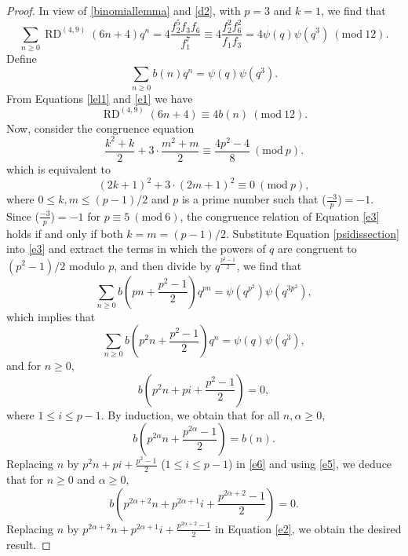 \documentclass[10pt,a4paper]{amsart}
\DeclareMathOperator {\myRD}{RD}
\begin{document}
\begin{proof} 
In view of \eqref{binomiallemma} and \eqref{d2}, with $p=3$ and $k=1$, we find that
\begin{equation}
\sum_{n\geq 0} \myRD^{(4, 9)}(6n+4)q^{n}=4\dfrac{f_{2}^{5}f_{3}f_{6}}{f_{1}^{7}} \equiv 4 \dfrac{f_{2}^{2} f_{6}^{2}}{f_{1} f_{3}} = 4\psi(q) \psi(q^{3}) \ (\mathrm{mod} \ 12). \label{lel1}
\end{equation}
Define
\begin{equation} 
\sum_{n\geq 0} b(n)q^{n} = \psi(q) \psi(q^{3}). \label{e1}
\end{equation}
From  Equations \eqref{lel1} and \eqref{e1} we have 
\begin{equation}
\myRD^{(4, 9)}(6n+4) \equiv 4b(n) \ (\mathrm{mod} \ 12).  \label{e2}
\end{equation} 
Now, consider the congruence equation
\[
\frac{k^{2}+k}{2}+3\cdot \frac{m^{2}+m}{2} \equiv  \frac{4p^{2}-4}{8} \ (\mathrm{mod} \ p).
\]
which is equivalent to
\begin{equation}
(2k+1)^{2}+ 3\cdot (2m+1)^{2}  \equiv  0 \ (\mathrm{mod} \ p), \label{e3}
\end{equation}
where $0 \leq k,m \leq (p-1)/2$ and $p$ is a prime number such that ($\frac{-3}{p}$)$=-1$. Since ($\frac{-3}{p}$)$=-1$ for $p \equiv 5 \ (\mathrm{mod} \ 6)$, the congruence relation of Equation \eqref{e3} holds if and only if both $k=m=(p-1)/2$. Substitute Equation \eqref{psidissection} into \eqref{e3} and extract the terms in which the powers of $q$ are congruent to $(p^{2}-1)/2$ modulo $p$, and then divide by $q^{\frac{p^{2}-1}{2}}$, we find that
\[
\sum_{n\geq 0} b \left(pn+\frac{p^{2}-1}{2} \right) q^{pn} = \psi(q^{p^{2}}) \psi(q^{3p^{2}}),
\]
which implies that 
\[
\sum_{n\geq 0} b\left( p^{2}n+\frac{p^{2}-1}{2} \right)q^{n} = \psi(q) \psi(q^{3}),
\]
and for $n\geq 0$,
\begin{equation}
b \left(p^{2}n+pi+\frac{p^{2}-1}{2}\right) = 0, \label{e5}
\end{equation}
where  $1\leq i \leq p-1$. By induction, we obtain  that for all $n, \alpha \geq 0$,
\begin{equation}
b\left( p^{2\alpha}n+\frac{p^{2\alpha}-1}{2} \right)=b(n). \label{e6}
\end{equation}
Replacing $n$ by $p^{2}n+pi+\frac{p^{2}-1}{2}$ ($1\leq i \leq p-1$) in \eqref{e6} and using \eqref{e5}, we deduce that for $n\geq 0$ and $\alpha \geq 0$,
\[
b\left( p^{2\alpha+2}n+p^{2\alpha+1}i+\frac{p^{2\alpha+2}-1}{2} \right)=0.
\]
Replacing $n$ by $p^{2\alpha+2}n+p^{2\alpha+1}i+\frac{p^{2\alpha+2}-1}{2}$ in Equation \eqref{e2}, we obtain the desired result.
\end{proof}
\end{document}
